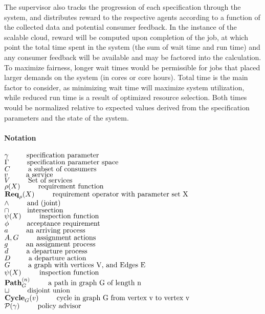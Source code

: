 \documentclass{article}
\newenvironment{notation}
{
    \newpage
    
    \paragraph{\Huge Notation}
    \begin{flushleft}
}
{
    \end{flushleft}
}
\newcommand{\notate}[2]{$#1 \hspace{0.35in} \mbox{#2}$}
\theoremstyle{definition}
\theoremstyle{remark}
\newcommand{\reqop}[2]{\mathbf{Req}_{#1}(#2)}
\newcommand{\path}[2]{\mathbf{Path}^{#2}_{#1}}
\newcommand{\cyclepath}[1]{\mathbf{Cycle}_{#1}}
\begin{document}
	The supervisor also tracks the progression of each specification through the system, and distributes reward to the respective agents according to a function of the collected data and potential consumer feedback. In the instance of the scalable cloud, reward will be computed upon completion of the job, at which point the total time spent in the system (the sum of wait time and run time) and any consumer feedback will be available and may be factored into the calculation. To maximize fairness, longer wait times would be permissible for jobs that placed larger demands on the system (in cores or core hours). Total time is the main factor to consider, as minimizing wait time will maximize system utilization, while reduced run time is a result of optimized resource selection. Both times would be normalized relative to expected values derived from the specification parameters and the state of the system.
	
	\newpage    

	\begin{notation}
		\notate{\gamma}{specification parameter}\\
		\notate{\Gamma}{specification parameter space}\\
		\notate{C}{a subset of consumers}\\
		\notate{v}{a service}\\
		\notate{V}{Set of services}\\
		\notate{\rho(X)}{requirement function}\\
		\notate{\reqop{\rho}{X}}{requirement operator with parameter set X}\\
        \notate{\wedge}{and (joint)}\\
        \notate{\cap}{intersection}\\
        \notate{\psi(X)}{inspection function}\\
        \notate{\phi}{acceptance requirement}\\
		\notate{a}{an arriving process}\\
		\notate{A,G}{assignment actions}\\
		\notate{g}{an assignment process}\\
		\notate{d}{a departure process}\\
		\notate{D}{a departure action}\\
        \notate{G}{a graph with vertices V, and Edges E}\\
        \notate{\psi(X)}{inspection function}\\
        \notate{\path{G}{(n)}}{a path in graph G of length n}\\
        \notate{\sqcup}{disjoint union}\\
        \notate{\cyclepath{G}(v)}{cycle in graph G from vertex v to vertex v}\\
        \notate{\mathcal{P}(\gamma)}{policy advisor}
     \end{notation}

	\newpage
	
\end{document}
